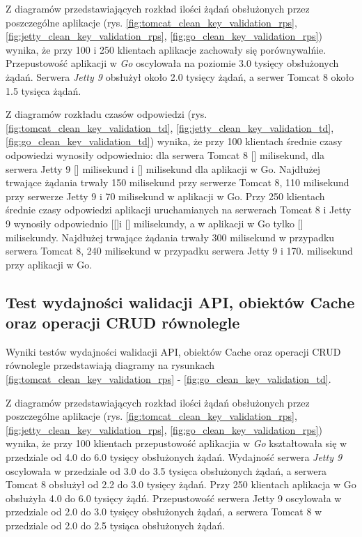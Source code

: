 Z diagramów przedstawiających rozkład ilości żądań obsłużonych przez poszczególne aplikacje  (rys. \ref{fig:tomcat_clean_key_validation_rps}, \ref{fig:jetty_clean_key_validation_rps}, \ref{fig:go_clean_key_validation_rps}) wynika, że przy 100 i 250 klientach aplikacje zachowały się  porównywalńie. Przepustowość aplikacji w \textsl{Go} oscylowała na poziomie 3.0 tysięcy obsłużonych żądań. Serwera \textsl{Jetty 9} obsłużył około 2.0 tysięcy  żądań, a serwer Tomcat 8 około 1.5 tysięca żądań.


Z diagramów rozkładu czasów odpowiedzi (rys. \ref{fig:tomcat_clean_key_validation_td}, \ref{fig:jetty_clean_key_validation_td}, \ref{fig:go_clean_key_validation_td}) wynika, że przy 100 klientach średnie czasy odpowiedzi wynosiły odpowiednio: dla serwera Tomcat 8 [] milisekund, dla serwera Jetty 9 [] milisekund i [] milisekund dla aplikacji w Go.  Najdłużej trwające żądania trwały 150 milisekund przy serwerze Tomcat 8, 110 milisekund przy serwerze  Jetty 9 i 70 milisekund  w aplikacji w Go. Przy 250 klientach średnie czasy odpowiedzi aplikacji uruchamianych na serwerach Tomcat 8 i Jetty 9  wynosiły odpowiednio [[]i [] milisekundy, a w aplikacji w Go tylko [] milisekundy. Najdłużej trwające żądania trwały 300 milisekund w przypadku serwera Tomcat 8, 240 milisekund w przypadku serwera Jetty 9 i 170. milisekund przy aplikacji w Go. 

% 
\clearpage

\subsection{Test wydajności walidacji API, obiektów Cache oraz operacji CRUD równolegle }

Wyniki testów wydajności walidacji API, obiektów Cache oraz operacji CRUD równolegle przedstawiają diagramy na rysunkach \ref{fig:tomcat_clean_key_validation_rps} - \ref{fig:go_clean_key_validation_td}.              

Z diagramów przedstawiających rozkład ilości żądań obsłużonych przez poszczególne aplikacje  (rys. \ref{fig:tomcat_clean_key_validation_rps}, \ref{fig:jetty_clean_key_validation_rps}, \ref{fig:go_clean_key_validation_rps}) wynika, że przy 100 klientach przepustowość aplikacjia w \textsl{Go} kształtowała się w przedziale od 4.0 do 6.0 tysięcy obsłużonych żądań. Wydajność serwera \textsl{Jetty 9} oscylowała w przedziale od 3.0 do 3.5 tysięca obsłużonych żądań, a  serwera Tomcat 8 obsłużył od 2.2 do 3.0 tysięcy żądań. Przy 250 klientach aplikacja w Go obsłużyła 4.0 do 6.0 tysięcy żądń. Przepustowość serwera Jetty 9 oscylowała w przedziale od 2.0 do 3.0 tysięcy obsłużonych żądań, a serwera Tomcat 8 w przedziale od 2.0 do 2.5 tysiąca obsłużonych żądań.


